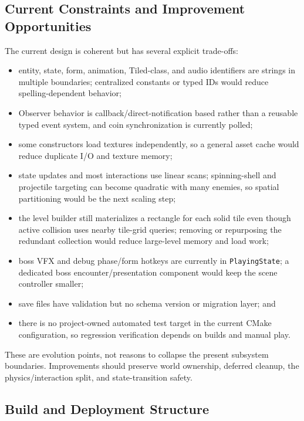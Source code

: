 \subsection{Current Constraints and Improvement Opportunities}

The current design is coherent but has several explicit trade-offs:

\begin{itemize}
    \item entity, state, form, animation, Tiled-class, and audio identifiers are
    strings in multiple boundaries; centralized constants or typed IDs would
    reduce spelling-dependent behavior;
    \item Observer behavior is callback/direct-notification based rather than a
    reusable typed event system, and coin synchronization is currently polled;
    \item some constructors load textures independently, so a general asset
    cache would reduce duplicate I/O and texture memory;
    \item state updates and most interactions use linear scans; spinning-shell
    and projectile targeting can become quadratic with many enemies, so spatial
    partitioning would be the next scaling step;
    \item the level builder still materializes a rectangle for each solid tile
    even though active collision uses nearby tile-grid queries; removing or
    repurposing the redundant collection would reduce large-level memory and
    load work;
    \item boss VFX and debug phase/form hotkeys are currently in
    \texttt{PlayingState}; a dedicated boss encounter/presentation component
    would keep the scene controller smaller;
    \item save files have validation but no schema version or migration layer;
    and
    \item there is no project-owned automated test target in the current CMake
    configuration, so regression verification depends on builds and manual play.
\end{itemize}

These are evolution points, not reasons to collapse the present subsystem
boundaries.  Improvements should preserve world ownership, deferred cleanup,
the physics/interaction split, and state-transition safety.

\subsection{Build and Deployment Structure}

